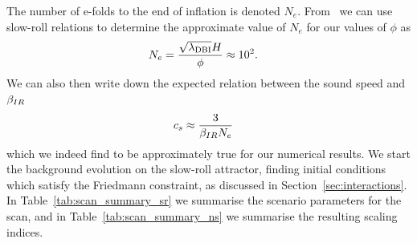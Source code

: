     The number of e-folds to the end of inflation is denoted $N_e$.
    From~\cite{Chen_dbi} we can use slow-roll relations to determine the approximate
    value of $N_e$
    for our values of $\phi$ as
    \begin{align}
        N_e &= \frac{\sqrt{\lambda_{\dbi}}H}{\phi}\approx10^2.%
    \end{align}
    We can also then write down the expected relation between the sound speed
    and $\beta_{IR}$
    \begin{align}
        c_s &\approx \frac{3}{\bir N_e}%
    \end{align}
    which we indeed find to be approximately true for our numerical results.
    We start the background evolution on the slow-roll attractor, finding initial conditions which
    satisfy the Friedmann constraint, as discussed in Section~\ref{sec:interactions}.
    In Table~\ref{tab:scan_summary_sr} we summarise the scenario parameters for the scan,
    and in Table~\ref{tab:scan_summary_ns} we summarise the resulting scaling indices.
 



